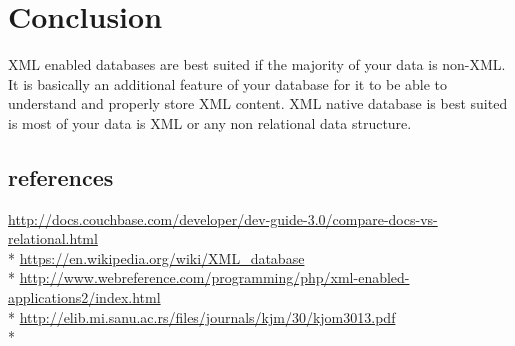 \section{Conclusion}
XML enabled databases are best suited if the majority of your data is non-XML. It is basically an additional feature of your database for it to be able to understand and properly store XML content. XML native database is best suited is most of your data is XML or any non relational data structure.
\subsection{references}


\textcolor{blue}{\url{ http://docs.couchbase.com/developer/dev-guide-3.0/compare-docs-vs-relational.html}}\\*
\textcolor{blue}{\url{ https://en.wikipedia.org/wiki/XML_database}}\\*
\textcolor{blue}{\url{ http://www.webreference.com/programming/php/xml-enabled-applications2/index.html}}\\*
\textcolor{blue}{\url{ http://elib.mi.sanu.ac.rs/files/journals/kjm/30/kjom3013.pdf}}\\*


